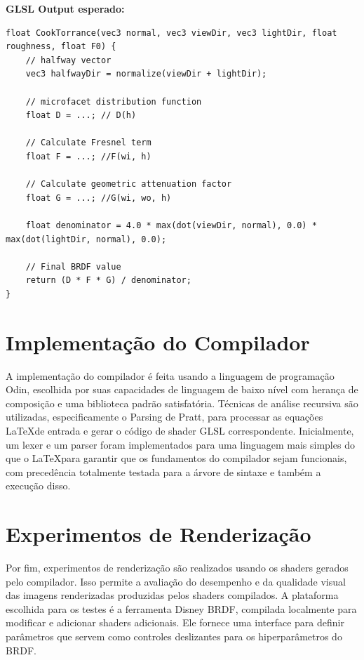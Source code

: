 \documentclass[english, 
               brazil, 
               bsc] %
               {dcomp-abntex2}
\begin{document}
\textbf{GLSL Output esperado:}
\begin{verbatim}
float CookTorrance(vec3 normal, vec3 viewDir, vec3 lightDir, float roughness, float F0) {
    // halfway vector
    vec3 halfwayDir = normalize(viewDir + lightDir);

    // microfacet distribution function
    float D = ...; // D(h)

    // Calculate Fresnel term
    float F = ...; //F(wi, h) 

    // Calculate geometric attenuation factor
    float G = ...; //G(wi, wo, h)

    float denominator = 4.0 * max(dot(viewDir, normal), 0.0) * max(dot(lightDir, normal), 0.0);

    // Final BRDF value
    return (D * F * G) / denominator;
}
\end{verbatim}

\section{Implementação do Compilador} \label{compiladorimplementacao}

A implementação do compilador é feita usando a linguagem de programação Odin, escolhida por suas capacidades de linguagem de baixo nível com herança de composição e uma biblioteca padrão satisfatória. Técnicas de análise recursiva são utilizadas, especificamente o Parsing de Pratt, para processar as equações \LaTeX  de entrada e gerar o código de shader GLSL correspondente. Inicialmente, um lexer e um parser foram implementados para uma linguagem mais simples do que o \LaTeX  para garantir que os fundamentos do compilador sejam funcionais, com precedência totalmente testada para a árvore de sintaxe e também a execução disso.

\section{Experimentos de Renderização}

Por fim, experimentos de renderização são realizados usando os shaders gerados pelo compilador. Isso permite a avaliação do desempenho e da qualidade visual das imagens renderizadas produzidas pelos shaders compilados. A plataforma escolhida para os testes é a ferramenta Disney BRDF, compilada localmente para modificar e adicionar shaders adicionais. Ele fornece uma interface para definir parâmetros que servem como controles deslizantes para os hiperparâmetros do BRDF.
\end{document}

